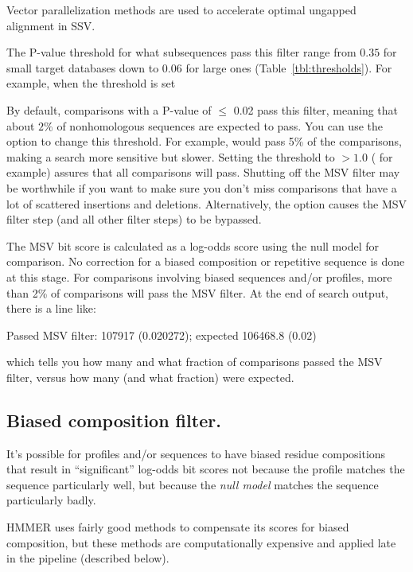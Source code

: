 Vector parallelization methods are used to accelerate optimal ungapped
alignment in SSV.

The P-value threshold for what subsequences pass this filter range
from $0.35$ for small target databases down to $0.06$ for large ones
(Table~\ref{tbl:thresholds}). For example, when the threshold is set 



By default, comparisons with a P-value of $\leq$ 0.02 pass this
filter, meaning that about $2\%$ of nonhomologous sequences are
expected to pass. You can use the  option to change
this threshold. For example,  would pass 5\% of the
comparisons, making a search more sensitive but slower. Setting the
threshold to $>1.0$ ( for example) assures that all
comparisons will pass. Shutting off the MSV filter may be worthwhile
if you want to make sure you don't miss comparisons that have a lot of
scattered insertions and deletions. Alternatively, the 
option causes the MSV filter step (and all other filter steps) to be
bypassed.

The MSV bit score is calculated as a log-odds score using the null
model for comparison. No correction for a biased composition or
repetitive sequence is done at this stage. For comparisons involving
biased sequences and/or profiles, more than 2\% of comparisons will
pass the MSV filter. At the end of search output, there is a line
like:

\begin{sreoutput}
 Passed MSV filter:                    107917  (0.020272); expected 106468.8 (0.02)
\end{sreoutput}

 which tells you how many and what fraction of comparisons passed the
 MSV filter, versus how many (and what fraction) were expected. 

\subsection{Biased composition filter.}

It's possible for profiles and/or sequences to have biased residue
compositions that result in ``significant'' log-odds bit scores not
because the profile matches the sequence particularly well, but
because the \emph{null model} matches the sequence particularly badly.

HMMER uses fairly good methods to compensate its scores for biased
composition, but these methods are computationally expensive and
applied late in the pipeline (described below).

